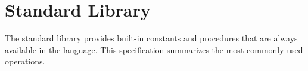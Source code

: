\section{Standard Library}

The standard library provides built-in constants and procedures that are always
available in the language. This specification summarizes the most commonly used
operations.
